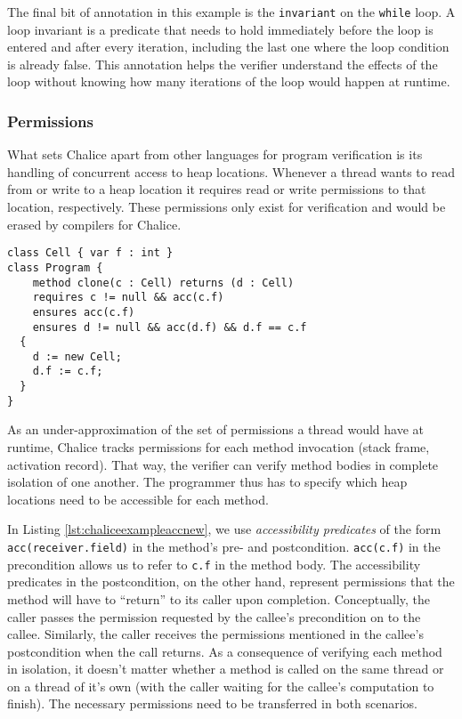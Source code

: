 The final bit of annotation in this example is the \lstinline[language=Chalice]!invariant! on the \lstinline[language=Chalice]!while! loop. 
A loop invariant is a predicate that needs to hold immediately before the loop is entered and after every iteration, including the last one where the loop condition is already false.
This annotation helps the verifier understand the effects of the loop without knowing how many iterations of the loop would happen at runtime.

\subsubsection{Permissions}

What sets Chalice apart from other languages for program verification is its handling of concurrent access to heap locations. 
Whenever a thread wants to read from or write to a heap location it requires read or write permissions to that location, respectively.
These permissions only exist for verification and would be erased by compilers for Chalice.

\begin{lstlisting}[language=Chalice,float,caption={Chalice example of object creation and (write) accessibility predicates.},label={lst:chaliceexampleaccnew}]
class Cell { var f : int }
class Program {
 	method clone(c : Cell) returns (d : Cell)
    requires c != null && acc(c.f)
    ensures acc(c.f)
    ensures d != null && acc(d.f) && d.f == c.f
  {
    d := new Cell;
    d.f := c.f;
  }
}
\end{lstlisting}

As an under-approximation of the set of permissions a thread would have at runtime, Chalice tracks permissions for each method invocation (stack frame, activation record). 
That way, the verifier can verify method bodies in complete isolation of one another. 
The programmer thus has to specify which heap locations need to be accessible for each method.

In Listing \ref{lst:chaliceexampleaccnew}, we use \emph{accessibility predicates} of the form \lstinline!acc(receiver.field)! in the method's pre- and postcondition. 
\lstinline!acc(c.f)! in the precondition allows us to refer to \lstinline!c.f! in the method body. 
The accessibility predicates in the postcondition, on the other hand, represent permissions that the method will have to ``return'' to its caller upon completion.
Conceptually, the caller passes the permission requested by the callee's precondition on to the callee.
Similarly, the caller receives the permissions mentioned in the callee's postcondition when the call returns.
As a consequence of verifying each method in isolation, it doesn't matter whether a method is called on the same thread or on a thread of it's own (with the caller waiting for the callee's computation to finish). 
The necessary permissions need to be transferred in both scenarios.

